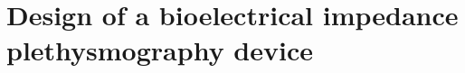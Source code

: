 
\chapter{Design of a bioelectrical impedance plethysmography device}
\label{chapter design}

\ifpdf
    \graphicspath{{Chapter4/Figs/Raster/}{Chapter4/Figs/PDF/}{Chapter4/Figs/}}
\else
    \graphicspath{{Chapter4/Figs/Vector/}{Chapter4/Figs/}}
\fi


%
%
